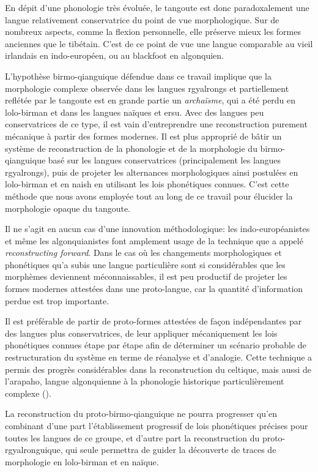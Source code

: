\documentclass[oldfontcommands,twoside,a4paper,11pt,draft]{memoir}
\begin{document}
En dépit d'une phonologie très évoluée, le tangoute est donc paradoxalement une langue relativement conservatrice du point de vue morphologique. Sur de nombreux aspects, comme la flexion personnelle, elle préserve mieux les formes anciennes que le tibétain. C'est de ce point de vue une langue comparable au vieil irlandais en indo-européen, ou au blackfoot en algonquien.

L'hypothèse birmo-qianguique défendue dans ce travail implique que la morphologie complexe observée dans les langues rgyalrongs et partiellement reflétée par le tangoute est en grande partie un \textit{archaïsme}, qui a été perdu en lolo-birman et dans les langues naïques et ersu. Avec des langues peu conservatrices de ce type, il est vain d'entreprendre une reconstruction purement mécanique à partir des formes modernes. Il est plus approprié de bâtir un système de reconstruction de la phonologie et de la morphologie du birmo-qianguique basé sur les langues conservatrices (principalement les langues rgyalrongs), puis de projeter les alternances morphologiques ainsi postulées  en lolo-birman et en naish en utilisant les lois phonétiques connues. C'est cette méthode que nous avons employée tout au long de ce travail pour élucider la morphologie opaque du tangoute. 

Il ne s'agit en aucun cas d'une innovation méthodologique: les indo-européanistes et même les algonquianistes font amplement usage de la technique que \citet[5]{watkins62celtic} a appelé \textit{reconstructing forward}. Dans le cas où les changements morphologiques et phonétiques qu'a subis une langue particulière sont si considérables que les morphèmes deviennent méconnaissables, il est peu productif de projeter les formes modernes attestées dans une proto-langue, car la quantité d'information perdue est trop importante.

Il est préférable de partir de proto-formes attestées de façon indépendantes par des langues plus conservatrices, de leur appliquer mécaniquement les lois phonétiques connues étape par étape afin de déterminer un scénario probable de restructuration du système en terme de réanalyse et d'analogie. Cette technique a permis des progrès considérables dans la reconstruction du celtique, mais aussi de l'arapaho, langue algonquienne à la phonologie historique particulièrement complexe (\citealt{goddard98arapaho}).

La reconstruction du proto-birmo-qianguique ne pourra progresser qu'en combinant d'une part l'établissement progressif de lois phonétiques précises pour toutes les langues de ce groupe, et d'autre part la reconstruction du proto-rgyalronguique, qui seule permettra de guider la découverte de traces de morphologie en lolo-birman et en naïque.
\end{document}
